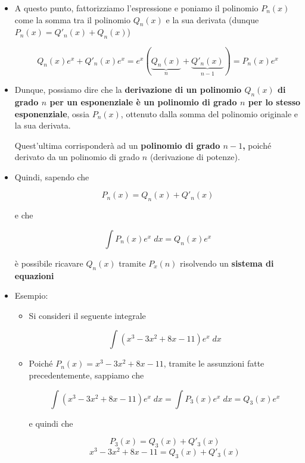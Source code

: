 \documentclass[a4paper, 12pt]{report}
\begin{document}
\begin{enumerate}
\begin{itemize}
            \[ [Q_n(x)e^x]' = Q'_n(x)e^x+Q_n(x)e^x \]
            
            \item A questo punto, fattorizziamo l'espressione e poniamo il polinomio $P_n(x)$ come la somma tra il polinomio $Q_n(x)$ e la sua derivata (dunque $P_n(x) = Q'_n(x) + Q_n(x)$)
            
            \[ Q_n(x)e^x+Q'_n(x)e^x = e^x(\underbrace{Q_n(x)}_{n} + \underbrace{Q'_n(x)}_{n-1}) = P_n(x)e^x\]
            
            \item Dunque, possiamo dire che la \textbf{derivazione di un polinomio $Q_n(x)$ di grado $n$ per un esponenziale è un polinomio di grado $n$ per lo stesso esponenziale}, ossia $P_n(x)$, ottenuto dalla somma del polinomio originale e la sua derivata.
            
            Quest'ultima corrisponderà ad un \textbf{polinomio di grado $n-1$,} poiché derivato da un polinomio di grado $n$ (derivazione di potenze). 
            
            \item Quindi, sapendo che 
            
            \[ P_n(x) = Q_n(x) + Q'_n(x)\]
            
            e che
            
            \[ \int P_n(x) e^x \; dx = Q_n(x)e^x\]
            
            è possibile ricavare $Q_n(x)$ tramite $P_x(n)$ risolvendo un \textbf{sistema di equazioni}
            
            \item Esempio:
            \begin{itemize}
                \item Si consideri il seguente integrale
                
                \[ \int (x^3-3x^2+8x-11)e^x \; dx \]
                
                \item Poiché $P_n(x) = x^3-3x^2+8x-11$, tramite le assunzioni fatte precedentemente, sappiamo che 
                
                \[ \int (x^3-3x^2+8x-11)e^x \; dx = \int P_3(x) e^x \; dx = Q_3(x)e^x\]
                
                e quindi che
                
                \[ P_3(x) = Q_3(x)+Q'_3(x)\]
                \[ x^3-3x^2+8x-11 = Q_3(x)+Q'_3(x)\]
                

\end{itemize}
\end{itemize}
\end{enumerate}
\end{document}
